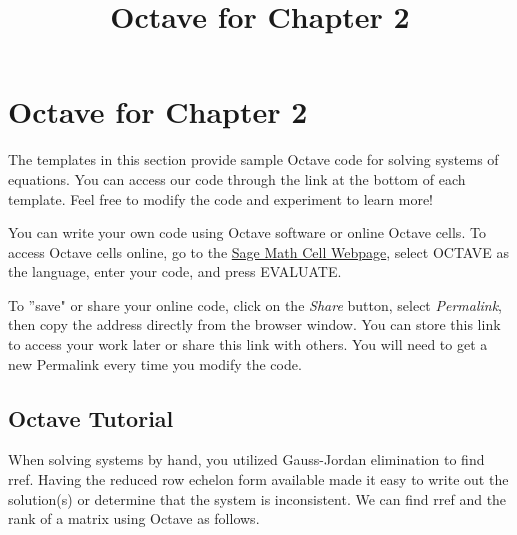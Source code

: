 \documentclass{ximera}
\title{Octave for Chapter 2} \license{CC BY-NC-SA 4.0}
\begin{document}
\begin{abstract}
\end{abstract}
\maketitle

\section*{Octave for Chapter 2}

The templates in this section provide sample Octave code for solving systems of equations. You can access our code through the link at the bottom of each template.  Feel free to modify the code and experiment to learn more!  

You can write your own code using Octave software or online Octave cells.  To access Octave cells online, go to the \href{https://sagecell.sagemath.org/}{Sage Math Cell Webpage}, select OCTAVE as the language, enter your code, and press EVALUATE.  

To ''save" or share your online code, click on the \emph{Share} button, select \emph{Permalink}, then copy the address directly from the browser window.  You can store this link to access your work later or share this link with others.  You will need to get a new Permalink every time you modify the code.


\subsection*{Octave Tutorial}

When solving systems by hand, you utilized Gauss-Jordan elimination to find rref.  Having the reduced row echelon form available made it easy to write out the solution(s) or determine that the system is inconsistent.  We can find rref and the rank of a matrix using Octave as follows.
\end{document}
